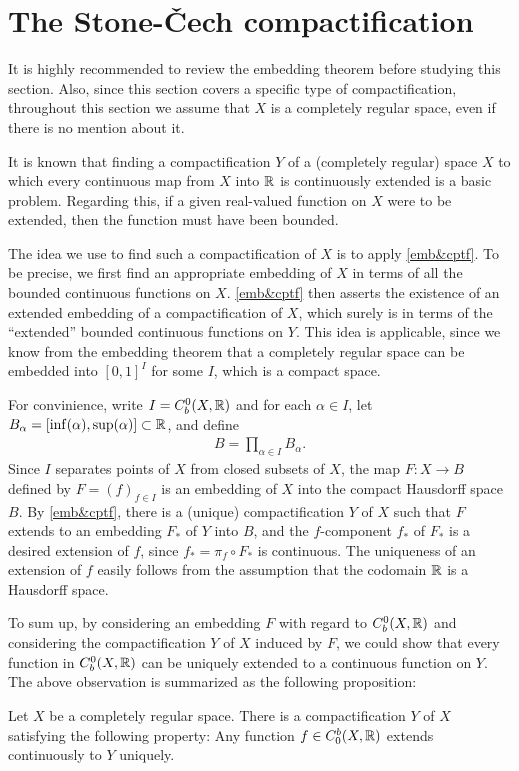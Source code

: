 \section{The Stone-\v{C}ech compactification}

It is highly recommended to review the embedding theorem before studying this section.
Also, since this section covers a specific type of compactification, throughout this section we assume that $X$ is a completely regular space, even if there is no mention about it.

It is known that finding a compactification $Y$ of a (completely regular) space $X$ to which every continuous map from $X$ into ${\mathbb{R}}$ is continuously extended is a basic problem.
Regarding this, if a given real-valued function on $X$ were to be extended, then the function must have been bounded.

The idea we use to find such a compactification of $X$ is to apply \cref{emb&cptf}.
To be precise, we first find an appropriate embedding of $X$ in terms of all the bounded continuous functions on $X$.
\cref{emb&cptf} then asserts the existence of an extended embedding of a compactification of $X$, which surely is in terms of the ``extended'' bounded continuous functions on $Y$.
This idea is applicable, since we know from the embedding theorem that a completely regular space can be embedded into $[0, 1]^I$ for some $I$, which is a compact space.

For convinience, write $I=C_b^0(X, {\mathbb{R}})$ and for each $\alpha\in I$, let $B_\alpha=[\inf(\alpha), \sup(\alpha)]\subset{\mathbb{R}}$, and define
\begin{align*}
    B=\prod_{\alpha\in I}B_\alpha.
\end{align*}
Since $I$ separates points of $X$ from closed subsets of $X$, the map $F: X\rightarrow B$ defined by $F=(f)_{f\in I}$ is an embedding of $X$ into the compact Hausdorff space $B$.
By \cref{emb&cptf}, there is a (unique) compactification $Y$ of $X$ such that $F$ extends to an embedding $F_*$ of $Y$ into $B$, and the $f$-component $f_*$ of $F_*$ is a desired extension of $f$, since $f_*=\pi_f\circ F_*$ is continuous.
The uniqueness of an extension of $f$ easily follows from the assumption that the codomain ${\mathbb{R}}$ is a Hausdorff space.

To sum up, by considering an embedding $F$ with regard to $C_b^0(X, {\mathbb{R}})$ and considering the compactification $Y$ of $X$ induced by $F$, we could show that every function in $C_b^0(X, {\mathbb{R}})$ can be uniquely extended to a continuous function on $Y$.
The above observation is summarized as the following proposition:
\begin{prop}\label{SC-cptf_ver1}
    Let $X$ be a completely regular space.
    There is a compactification $Y$ of $X$ satisfying the following property:
    Any function $f\in C_0^b(X, {\mathbb{R}})$ extends continuously to $Y$ uniquely.
\end{prop}

